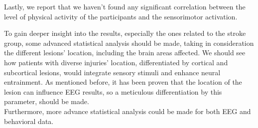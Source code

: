 Lastly, we report that we haven't found any significant correlation between the level of physical activity of the participants and the sensorimotor activation. 

To gain deeper insight into the results, especially the ones related to the stroke group, some advanced statistical analysis should be made, taking in consideration the different lesions' location, including the brain areas affected. We should see how patients with diverse injuries' location, differentiated by cortical and subcortical lesions, would integrate sensory stimuli and enhance neural entrainment. As mentioned before, it has been proven that the location of the lesion can influence EEG results, so a meticulous differentiation by this parameter, should be made. \\
Furthermore, more advance statistical analysis could be made for both EEG and behavioral data.